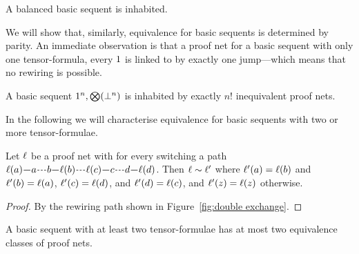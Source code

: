 \documentclass{lmcs}
\begin{document}
\begin{proposition}
A balanced basic sequent is inhabited.
\end{proposition}


We will show that, similarly, equivalence for basic sequents is determined by parity.
%
An immediate observation is that a proof net for a basic sequent with only one tensor-formula, every $1$ is linked to by exactly one jump---which means that no rewiring is possible.


\begin{proposition}
A basic sequent $1^n,\bigotimes(\bot^n)$ is inhabited by exactly $n!$ inequivalent proof nets.
\end{proposition}


In the following we will characterise equivalence for basic sequents with two or more tensor-formulae.


\begin{lemma}
\label{lem:double exchange}
Let $\ell$ be a proof net with for every switching a path
$\links(a){\xedge}a{\xpath}b{\xedge}\links(b){\xpath}\links(c){\xedge}c{\xpath}d{\xedge}\links(d)$.
%
Then $\links\perm\links'$ where $\ell'(a)=\ell(b)$ and $\ell'(b)=\ell(a)$, $\ell'(c)=\ell(d)$, and $\ell'(d)=\ell(c)$, and $\ell'(z)=\ell(z)$ otherwise.
%
\end{lemma}

\begin{proof}
By the rewiring path shown in Figure~\ref{fig:double exchange}.
\end{proof}



\begin{lemma}
\label{lem:level0 max binary}
%
A basic sequent with at least two tensor-formulae has at most two equivalence classes of proof nets.
%
\end{lemma}
\end{document}
